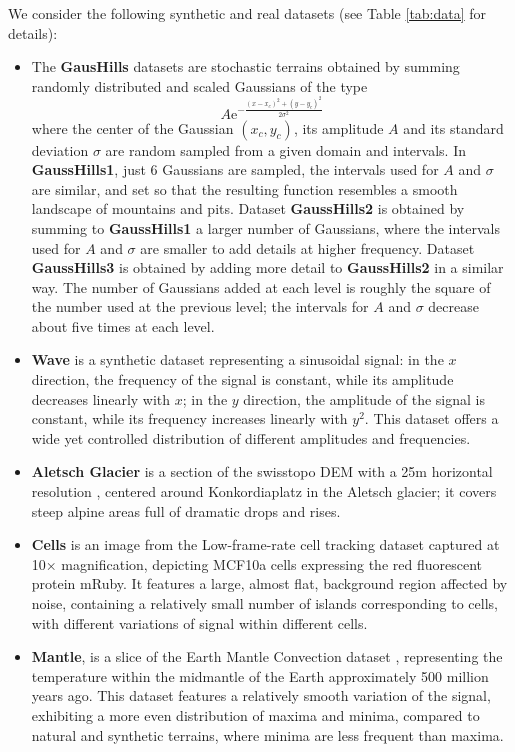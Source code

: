 We consider the following synthetic and real datasets (see Table \ref{tab:data} for details):
\begin{itemize}
\item The \textbf{GausHills} datasets are stochastic terrains obtained by summing randomly distributed and scaled Gaussians of the type
\[A \mathrm{e}^{-\frac{(x-x_c)^2 + (y-y_c)^2}{2\sigma^2}}\]
where the center of the Gaussian $(x_c,y_c)$, its amplitude $A$ and its standard deviation $\sigma$ are random sampled from a given domain and intervals.
In \textbf{GaussHills1}, just 6 Gaussians are sampled, the intervals used for $A$ and $\sigma$ are similar, and set so that the resulting function resembles a smooth landscape of mountains and pits. 
Dataset \textbf{GaussHills2} is obtained by summing to \textbf {GaussHills1} a larger number of Gaussians, where the intervals used for $A$ and $\sigma$ are smaller to add details at higher frequency.
Dataset \textbf{GaussHills3} is obtained by adding more detail to \textbf{GaussHills2} in a similar way.
The number of Gaussians added at each level is roughly the square of the number used at the previous level; the intervals for $A$ and $\sigma$ decrease about five times at each level. 
\item\textbf{Wave} is a synthetic dataset representing a sinusoidal signal: in the $x$ direction, the frequency of the signal is constant, while its amplitude decreases linearly with $x$; in the $y$ direction, the amplitude of the signal is constant, while its frequency increases linearly with $y^2$. 
This dataset offers a wide yet controlled distribution of different amplitudes and frequencies. 
\item \textbf{Aletsch Glacier} is a section of the swisstopo DEM with a 25m horizontal resolution \cite{dhm25}, centered around Konkordiaplatz in the Aletsch glacier; it covers steep alpine areas full of dramatic drops and rises. 
\item \textbf{Cells}  is an image from the Low-frame-rate cell tracking dataset \cite{LFCT} captured at 10× magnification, depicting MCF10a cells expressing the red fluorescent protein mRuby. It features a large, almost flat, background region affected by noise, containing a relatively small number of islands corresponding to cells, with different variations of signal within different cells.
 \item \textbf{Mantle}, is a slice of the Earth Mantle Convection dataset \cite{scivis2021}, representing the temperature within the midmantle of the Earth approximately 500 million years ago. This dataset features a relatively smooth variation of the signal, exhibiting a more even distribution of maxima and minima, compared to natural and synthetic terrains, where minima are less frequent than maxima.  
\end{itemize}


